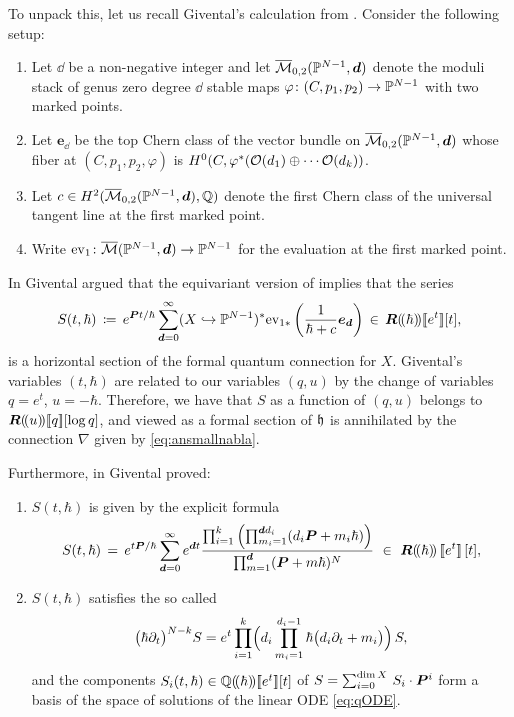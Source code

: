 \documentclass[twoside,leqno]{article}
\numberwithin{equation}{section}
\theoremstyle{plain}
\theoremstyle{definition}
\begin{document}
To unpack this, let us recall Givental's calculation from \cite[Section~9]{Givental_Equivariant_Gromov-Witten_invariants}.  Consider the following setup:
\begin{enumerate}[wide]
    \item Let $\dd$ be a non-negative integer and let
$\overline{\mathcal{M}}_{0,2}(\mathbb P^{N-1},\boldsymbol{d})$ denote the moduli stack of genus zero degree $\dd$ stable maps 
$\varphi \colon (C,p_{1},p_{2}) \to \mathbb P^{N-1}$ with two marked points.  
\item Let $\boldsymbol{e}_{\dd}$ be the top Chern class of the vector bundle on $\overline{\mathcal{M}}_{0,2}(\mathbb P^{N-1},\boldsymbol{d})$ whose fiber at $(C,p_{1},p_{2},\varphi)$ is $H^0(C,\varphi^{*}(\mathcal O(d_{1})\oplus \cdots \mathcal O(d_{k}))$.  
\item 
Let $c \in H^2(\overline{\mathcal{M}}_{0,2}(\mathbb P^{N-1},\boldsymbol{d}),\mathbb Q)$ denote the first Chern class of the universal tangent line at the first marked point.
\item Write $\mathrm{ev}_{1} \colon \overline{\mathcal{M}}(\mathbb P^{N-1},\boldsymbol{d}) \to \mathbb P^{N-1}$ for the evaluation at the first marked point. 
\end{enumerate}
In \cite[Section~9]{Givental_Equivariant_Gromov-Witten_invariants} Givental argued that the equivariant version of \cite[Corollary~6.4]{Givental_Equivariant_Gromov-Witten_invariants} implies that the series 
\[
S(t,\hbar) \, \coloneqq \, e^{\boldsymbol{P} t/\hbar} \sum_{\boldsymbol{d} = 0}^{\infty} (X\hookrightarrow \mathbb P^{N-1})^{*} \mathrm{ev}_{1*}\left(\frac{1}{\hbar +c} \boldsymbol{e}_{\boldsymbol{d}}\right) \, \in \, \boldsymbol{R}(\!(\hbar)\!)[\![e^t]\!][t],
\]
is a horizontal section of the formal quantum connection for $X$.
Givental's variables $(t,\hbar)$ are related to our variables $(q,u)$ by the change of variables $q = e^{t}$, $u = -\hbar$. Therefore, we have that $S$ as a function of $(q,u)$ belongs to  
$\boldsymbol{R}(\!(u)\!)[\![q]\!][\log q]$, and  viewed as a formal section of $\mathfrak{h}$ is annihilated by the connection $\nabla$ given by \eqref{eq:ansmallnabla}.

\medskip


Furthermore, in \cite[Theorem~9.1 and Corollary~9.2]{Givental_Equivariant_Gromov-Witten_invariants}
Givental proved:
\begin{enumerate}[wide]
    \item[(i)] $S(t,\hbar)$ is given by the explicit formula
\[
S(t,\hbar)  \, = \, e^{t\hpl/\hbar}\sum_{{\dd}=0}^\infty e^{\dd t} \frac{\prod_{i=1}^k \left(\prod_{m_i=1}^{\dd d_i}(d_i \hpl+m_i\hbar)\right)}{\prod_{m=1}^{\dd} (\hpl+m\hbar)^N} \ \in  \ \imageH(\!(\hbar)\!)\,\dbb{e^t}\,[t],
\]
\item[(ii)] $S(t,\hbar)$ satisfies the so called   
\begin{equation} \label{eq:qODE}
\bigl(\hbar \partial_t\bigr)^{N-k} S= e^t \prod_{i=1}^k\Bigl(d_i\prod_{m_i=1}^{d_i-1} \hbar\bigl(d_i\partial_t+m_i\bigr) \Bigr)\,S,
\end{equation}
and the components $S_{i}(t,\hbar) \in \mathbb Q(\!(\hbar)\!)[\![e^t]\!][t]$ of $S = \sum_{i=0}^{\dim X} \, S_{i}\cdot \boldsymbol{P}^{i}$ form a basis of the space of solutions of the linear ODE \eqref{eq:qODE}.
\end{enumerate}
\end{document}
